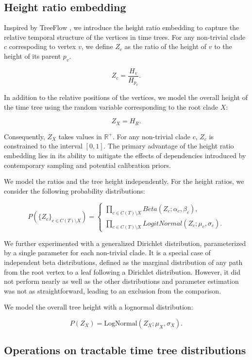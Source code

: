 \documentclass[10pt,letterpaper]{article}
\begin{document}
\subsection*{Height ratio embedding}

Inspired by TreeFlow \cite{treeflow}, we introduce the height ratio embedding to capture the relative temporal structure of the vertices in time trees. For any non-trivial clade $c$ correspoding to vertex $v$, we define $Z_c$ as the ratio of the height of $v$ to the height of its parent $p_v$.

$$
Z_c = \frac{H_v}{H_{p_v}}.
$$

In addition to the relative positions of the vertices, we model the overall height of the time tree using the random variable corresponding to the root clade $X$:

$$
Z_X = H_R.
$$

Consequently, $Z_X$ takes values in $\mathbb{R}^+$. For any non-trivial clade $c$, $Z_c$ is constrained to the interval $[0, 1]$. The primary advantage of the height ratio embedding lies in its ability to mitigate the effects of dependencies introduced by contemporary sampling and potential calibration priors.

We model the ratios and the tree height independently. For the height ratios, we consider the following probability distributions:

$$
P(\{Z_c\}_{c \in C(T) \setminus X}) = \begin{cases}
	\prod_{c \in C(T) \setminus X}{Beta(Z_c; \alpha_c, \beta_c)}, \\
	\prod_{c \in C(T) \setminus X}{LogitNormal(Z_c; \mu_c, \sigma_c)}.
\end{cases}
$$

We further experimented with a generalized Dirichlet distribution, parameterized by a single parameter for each non-trivial clade. It is a special case of independent beta distributions, defined as the marginal distribution of any path from the root vertex to a leaf following a Dirichlet distribution. However, it did not perform nearly as well as the other distributions and parameter estimation was not as straightforward, leading to an exclusion from the comparison.

We model the overall tree height with a lognormal distribution:

$$
P(Z_X) = \text{LogNormal}(Z_X; \mu_X, \sigma_X).
$$

\subsection*{Operations on tractable time tree distributions}
\end{document}
